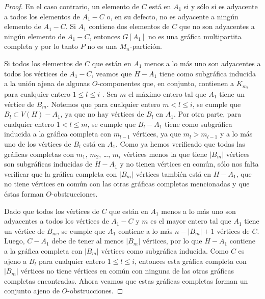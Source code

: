 \begin{proof}
En el caso contrario, un elemento de $C$ está en $A_1$ si y sólo si es adyacente a todos los elementos de $A_1-C$ o, en su defecto, no es adyacente a ningún elemento de $A_1-C$. Si $A_1$ contiene dos elementos de $C$ que no son adyacentes a ningún elemento de $A_1-C$, entonces $G[A_1]$ no es una gráfica multipartita completa y por lo tanto $P$ no es una $M_n$-partición. 

Si todos los elementos de $C$ que están en $A_1$ menos a lo más uno son adyacentes a todos los vértices de $A_1-C$, veamos que $H-A_1$ tiene como subgráfica inducida a la unión ajena de algunas $O$-componentes que, en conjunto, contienen a $K_{m_l}$ para cualquier entero $1\le l\le i$ . Sea $m$ el máximo entero tal que $A_1$ tiene un vértice de $B_m$. Notemos que para cualquier entero $m < l \le i$, se cumple que $B_{l}\subset V(H)-A_1$, ya que no hay vértices de $B_l$ en $A_1$. Por otra parte, para cualquier entero $1 < l \le m$, se cumple que $B_{l}-A_1$ tiene como subgráfica inducida a la gráfica completa con $m_{l-1}$ vértices, ya que $m_l>m_{l-1}$ y a lo más uno de los vértices de $B_l$ está en $A_1$. Como ya hemos verificado que todas las gráficas completas con $m_1$, $m_2$, \dots, $m_i$ vértices menos la que tiene $|B_m|$ vértices son subgráficas inducidas de $H-A_1$ y no tienen vértices en común, sólo nos falta verificar que la gráfica completa con $|B_m|$ vértices también está en $H-A_1$, que no tiene vértices en común con las otras gráficas completas mencionadas y que éstas forman $O$-obstrucciones.

Dado que todos los vértices de $C$ que están en $A_1$ menos a lo más uno son adyacentes a todos los vértices de $A_1-C$ y $m$ es el mayor entero tal que $A_1$ tiene un vértice de $B_m$, se cumple que $A_1$ contiene a lo más $n-|B_m|+1$ vértices de $C$. Luego, $C-A_1$ debe de tener al menos $|B_m|$ vértices, por lo que $H-A_1$ contiene a la gráfica completa con $|B_m|$ vértices como subgráfica inducida. Como $C$ es ajeno a $B_l$ para cualquier entero $1\le l\le i$, entonces esta gráfica completa con $|B_m|$ vértices no tiene vértices en común con ninguna de las otras gráficas completas encontradas. Ahora veamos que estas gráficas completas forman un conjunto ajeno de $O$-obstrucciones.


\end{proof}
